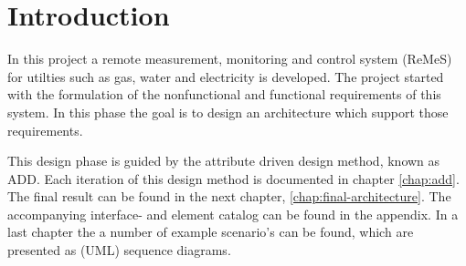 \chapter{Introduction}

\npar In this project a remote measurement, monitoring and control system
(ReMeS) for utilties such as gas, water and electricity is developed. The
project started with the formulation of the nonfunctional and functional
requirements of this system. In this phase the goal is to design an architecture
which support those requirements. 

\npar This design phase is guided by the attribute driven design method, known
as ADD. Each iteration of this design method is documented in chapter
\ref{chap:add}. The final result can be found in the next chapter,
\ref{chap:final-architecture}. The accompanying interface- and element catalog
can be found in the appendix. In a last chapter the a number of example
scenario's can be found, which are presented as (UML) sequence diagrams.
